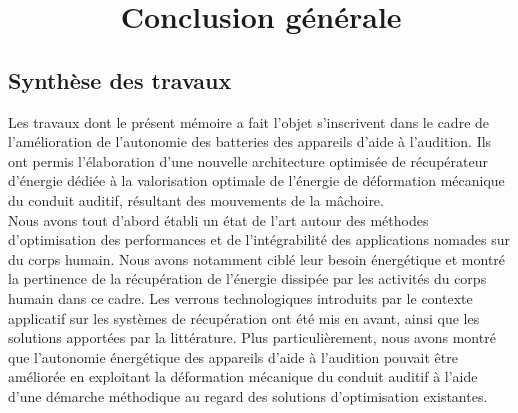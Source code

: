


{}

\vspace*{-1cm}
\section*{\fontsize{24pt}{24pt}\selectfont\textnormal{~~~~~~~Conclusion générale}}
\vspace{2cm}

\chead[\fancyplain{}{}]
      {\fancyplain{}{}}
\lfoot[\fancyplain{}{}]
      {\fancyplain{}{}}
\cfoot[\fancyplain{}{\thepage}]
      {\fancyplain{}{\thepage}}
\rfoot[\fancyplain{}{}]
     {\fancyplain{}{\scriptsize}}


\subsection*{Synthèse des travaux}
\label{sec:conclu_Synthese des travaux}

Les travaux dont le présent mémoire a fait l'objet s'inscrivent dans le cadre de l'amélioration de l'autonomie des batteries des appareils d'aide à l'audition. Ils ont permis l'élaboration d'une nouvelle architecture optimisée de récupérateur d'énergie dédiée à la valorisation optimale de l'énergie de déformation mécanique du conduit auditif, résultant des mouvements de la mâchoire.\\

Nous avons tout d'abord établi un état de l'art autour des méthodes d'optimisation des performances et de l'intégrabilité des applications nomades sur du corps humain. Nous avons notamment ciblé leur besoin énergétique et montré la pertinence de la récupération de l'énergie dissipée par les activités du corps humain dans ce cadre. Les verrous technologiques introduits par le contexte applicatif sur les systèmes de récupération ont été mis en avant, ainsi que les solutions apportées par la littérature. Plus particulièrement, nous avons montré que l'autonomie énergétique des appareils d'aide à l'audition pouvait être améliorée en exploitant la déformation mécanique du conduit auditif à l'aide d'une démarche méthodique au regard des solutions d'optimisation existantes.

